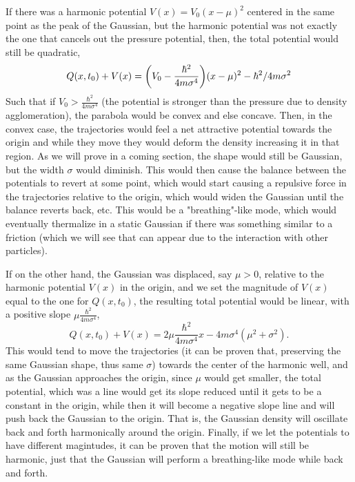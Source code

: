 \documentclass[11pt, a4paper]{article} %
\begin{document}
If there was a harmonic potential $V(x)=V_0(x-\mu)^2$ centered in the same point as the peak of the Gaussian, but the harmonic potential was not exactly the one that cancels out the pressure potential, then, the total potential would still be quadratic, 
\begin{equation}
Q(x,t_0)+V(x)=\qty(V_0-\frac{\hbar^2}{4m\sigma^4})(x-\mu)^2-\hbar^2/4m\sigma^2
\end{equation}
Such that if $V_0>\frac{\hbar^2}{4m\sigma^4}$ (the potential is stronger than the pressure due to density agglomeration), the parabola would be convex and else concave. Then, in the convex case, the trajectories would feel a net attractive potential towards the origin and while they move they would deform the density increasing it in that region. As we will prove in a coming section, the shape would still be Gaussian, but the width $\sigma$ would diminish. This would then cause the balance between the potentials to revert at some point, which would start causing a repulsive force in the trajectories relative to the origin, which would widen the Gaussian until the balance reverts back, etc. This would be a "breathing"-like mode, which would eventually thermalize in a static Gaussian if there was something similar to a friction (which we will see that can appear due to the interaction with other particles).

If on the other hand, the Gaussian was displaced, say $\mu>0$, relative to the harmonic potential $V(x)$ in the origin, and we set the magnitude of $V(x)$ equal to the one for $Q(x,t_0)$, the resulting total potential would be linear, with a positive slope $\mu\frac{\hbar^2}{4m\sigma^4}$,
\begin{equation}
Q(x,t_0)+V(x)=2\mu \frac{\hbar^2}{4m\sigma^4}x-{4m\sigma^4}(\mu^2+\sigma^2).
\end{equation} 
This would tend to move the trajectories (it can be proven that, preserving the same Gaussian shape, thus same $\sigma$) towards the center of the harmonic well, and as the Gaussian approaches the origin, since $\mu$ would get smaller, the total potential, which was a line would get its slope reduced until it gets to be a constant in the origin, while then it will become a negative slope line and will push back the Gaussian to the origin. That is, the Gaussian density will oscillate back and forth harmonically around the origin. Finally, if we let the potentials to have different magintudes, it can be proven that the motion will still be harmonic, just that the Gaussian will perform a breathing-like mode while back and forth.
\end{document}
